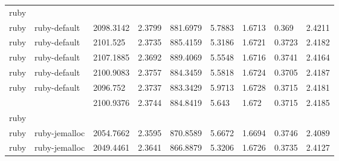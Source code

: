 \begin{longtable}[h]{|lllllllll|}
ruby           &                        &                           &                                                                      &                       &                  &                  &              &               \\
ruby           & ruby-default           & 2098.3142                 & 2.3799                                                               & 881.6979              & 5.7883           & 1.6713           & 0.369        & 2.4211        \\
ruby           & ruby-default           & 2101.525                  & 2.3735                                                               & 885.4159              & 5.3186           & 1.6721           & 0.3723       & 2.4182        \\
ruby           & ruby-default           & 2107.1885                 & 2.3692                                                               & 889.4069              & 5.5548           & 1.6716           & 0.3741       & 2.4164        \\
ruby           & ruby-default           & 2100.9083                 & 2.3757                                                               & 884.3459              & 5.5818           & 1.6724           & 0.3705       & 2.4187        \\
ruby           & ruby-default           & 2096.752                  & 2.3737                                                               & 883.3429              & 5.9713           & 1.6728           & 0.3715       & 2.4181        \\
               &                        & 2100.9376                 & 2.3744                                                               & 884.8419              & 5.643            & 1.672            & 0.3715       & 2.4185        \\
ruby           &                        &                           &                                                                      &                       &                  &                  &              &               \\
ruby           & ruby-jemalloc          & 2054.7662                 & 2.3595                                                               & 870.8589              & 5.6672           & 1.6694           & 0.3746       & 2.4089        \\
ruby           & ruby-jemalloc          & 2049.4461                 & 2.3641                                                               & 866.8879              & 5.3206           & 1.6726           & 0.3735       & 2.4127        \\

\end{longtable}
